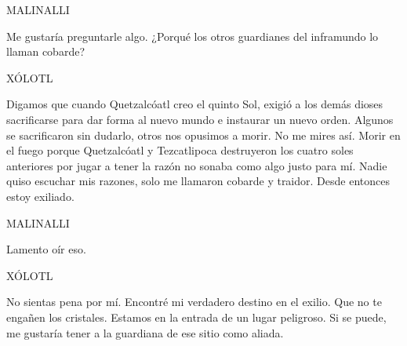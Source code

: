 \documentclass[11pt,letterpaper]{article}
\begin{document}
\begin{center}
MALINALLI
\\
\par
Me gustaría preguntarle algo. ¿Porqué los otros guardianes del inframundo lo llaman cobarde?
\\
\par
XÓLOTL
\\
\par
Digamos que cuando Quetzalcóatl creo el quinto Sol, exigió a los demás dioses sacrificarse para dar forma al nuevo mundo e instaurar un nuevo orden. Algunos se sacrificaron sin dudarlo, otros nos opusimos a morir. No me mires así. Morir en el fuego porque Quetzalcóatl y Tezcatlipoca destruyeron los cuatro soles anteriores por jugar a tener la razón no sonaba como algo justo para mí. Nadie quiso escuchar mis razones, solo me llamaron cobarde y traidor. Desde entonces estoy exiliado.
\\
\par
MALINALLI
\\
\par
Lamento oír eso.
\\
\par
XÓLOTL
\\
\par
No sientas pena por mí. Encontré mi verdadero destino en el exilio. Que no te engañen los cristales. Estamos en la entrada de un lugar peligroso. Si se puede, me gustaría tener a la guardiana de ese sitio como aliada. 
\end{center}
\end{document}
